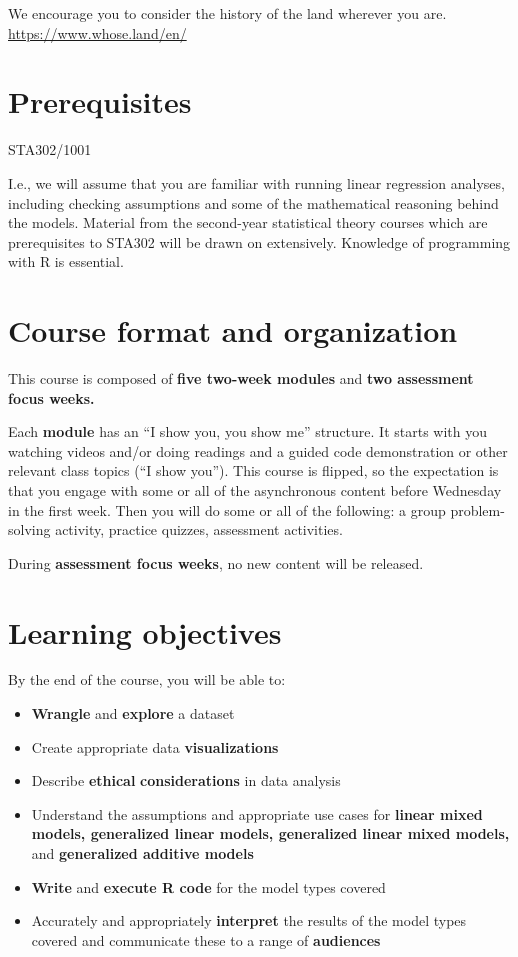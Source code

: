\documentclass[
  openany]{book}
\begin{document}
We encourage you to consider the history of the land wherever you are. \url{https://www.whose.land/en/}

\hypertarget{prerequisites}{%
\section{Prerequisites}\label{prerequisites}}

STA302/1001

I.e., we will assume that you are familiar with running linear regression analyses, including checking assumptions and some of the mathematical reasoning behind the models. Material from the second-year statistical theory courses which are prerequisites to STA302 will be drawn on extensively. Knowledge of programming with R is essential.

\hypertarget{course-format-and-organization}{%
\section{Course format and organization}\label{course-format-and-organization}}

This course is composed of \textbf{five two-week modules} and \textbf{two assessment focus weeks.}

Each \textbf{module} has an ``I show you, you show me'' structure. It starts with you watching videos and/or doing readings and a guided code demonstration or other relevant class topics (``I show you''). This course is flipped, so the expectation is that you engage with some or all of the asynchronous content before Wednesday in the first week. Then you will do some or all of the following: a group problem-solving activity, practice quizzes, assessment activities.

During \textbf{assessment focus weeks}, no new content will be released.

\hypertarget{learning-objectives}{%
\section{Learning objectives}\label{learning-objectives}}

By the end of the course, you will be able to:

\begin{itemize}
\item
  \textbf{Wrangle} and \textbf{explore} a dataset
\item
  Create appropriate data \textbf{visualizations}
\item
  Describe \textbf{ethical} \textbf{considerations} in data analysis
\item
  Understand the assumptions and appropriate use cases for \textbf{linear mixed models, generalized linear models, generalized linear mixed models,} and \textbf{generalized additive models}
\item
  \textbf{Write} and \textbf{execute R code} for the model types covered
\item
  Accurately and appropriately \textbf{interpret} the results of the model types covered and communicate these to a range of \textbf{audiences}
\end{itemize}
\end{document}
